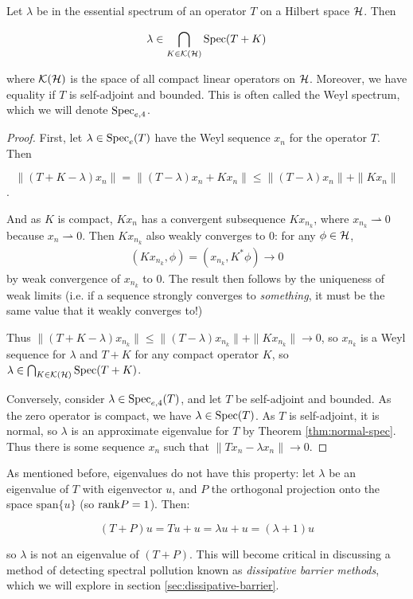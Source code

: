 \documentclass[../main.tex]{subfiles}
\begin{document}
\begin{theorem}
\label{thm:ess-spec-comp-ptb}
  Let $\lambda$ be in the essential spectrum of an operator $T$ on a Hilbert space
  $\mathcal{H}$. Then

  \begin{equation}
  \label{eqn:weyl_spectrum}
    \lambda \in \bigcap_{K \in \mathcal{K}(\mathcal{H})} \mathrm{Spec}(T + K)
  \end{equation}

  where $\mathcal{K}(\mathcal{H})$ is the space of all compact linear operators on $\mathcal{H}$.
  Moreover, we have equality if $T$ is self-adjoint and bounded.
  This is often called the Weyl spectrum, which we will denote $\mathrm{Spec}_{e,4}$.
\end{theorem}
\begin{proof}
First, let $\lambda \in \mathrm{Spec}_e(T)$ have the Weyl sequence $x_n$ for the operator $T$. Then 

$$\|(T+K-\lambda)x_n\| = \|(T - \lambda)x_n+Kx_n\| \leq \|(T - \lambda)x_n\| + \|Kx_n\|$$. 

And as $K$ is compact, $Kx_n$ has a convergent subsequence $Kx_{n_k}$, where
$x_{n_k} \rightharpoonup 0$ because $x_n \rightharpoonup 0$. Then
$Kx_{n_k}$ also weakly converges to 0: for any $\phi \in \mathcal{H}$,
\begin{align*}
(Kx_{n_k}, \phi) = (x_{n_k}, K^* \phi) \rightarrow 0
\end{align*}
by weak convergence of $x_{n_k}$ to 0. The result then follows by the uniqueness
of weak limits (i.e. if a sequence strongly converges to
\emph{something}, it must be the same value that it weakly converges to!)

Thus $\|(T+K-\lambda)x_{n_k}\| \leq \|(T - \lambda)x_{n_k}\| + \|Kx_{n_k}\|
\rightarrow 0$, so $x_{n_k}$ is a Weyl sequence for $\lambda$ and $T+K$
for any compact operator $K$, so $\lambda \in \bigcap_{K \in
\mathcal{K}(\mathcal{H})} \mathrm{Spec}(T + K)$.

  Conversely, consider $\lambda \in \mathrm{Spec}_{e,4}(T)$, and let $T$ be self-adjoint and bounded.
  As the zero operator is compact, we have $\lambda \in \mathrm{Spec}(T)$. As $T$ is self-adjoint,
  it is normal, so $\lambda$ is an approximate eigenvalue for $T$ by Theorem \ref{thm:normal-spec}.
  Thus there is some sequence $x_n$ such that $\|Tx_n - \lambda x_n\| \rightarrow 0$. 
\end{proof}

\begin{remark}
As mentioned before, eigenvalues do not have this property: let $\lambda$ be an
eigenvalue of $T$ with eigenvector $u$, and $P$ the orthogonal
projection onto the space $\mathrm{span}\{u\}$ (so $\mathrm{rank} P = 1$). Then:

$$(T+P) u = Tu + u = \lambda u + u = (\lambda + 1)u$$

so $\lambda$ is not an eigenvalue of $(T+P)$. This will become critical in
discussing a method of detecting spectral pollution known as
\emph{dissipative barrier methods}, which we will explore in section
\ref{sec:dissipative-barrier}.
\end{remark}
\end{document}
